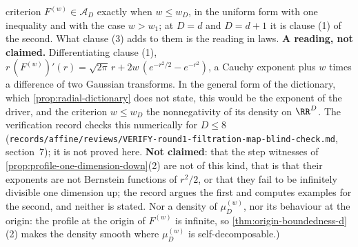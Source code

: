 \begin{proposition}
{criterion $F^{(w)} \in \mathcal{A}_D$ exactly when $w \le w_D$, in the uniform form with one
inequality and with the case $w > w_1$; at $D = d$ and $D = d + 1$ it is clause (1) of the
second. What clause (3) adds to them is the reading in laws. \textbf{A reading, not claimed.}
Differentiating clause (1), $r\,(F^{(w)})'(r) = \sqrt{2\pi}\,r + 2w\,(e^{-r^2/2} - e^{-r^2})$, a
Cauchy exponent plus $w$ times a difference of two Gaussian transforms. In the general form of
the dictionary, which \ref{prop:radial-dictionary} does not state, this would be the exponent of
the driver, and the criterion $w \le w_D$ the nonnegativity of its \Levy{} density on $\RR^D$.
The verification record checks this numerically for $D \le 8$
(\texttt{records/affine/reviews/VERIFY-round1-filtration-map-blind-check.md}, section~7); it is
not proved here. \textbf{Not claimed}: that the step witnesses of
\ref{prop:profile-one-dimension-down}(2) are not of this kind, that is that their exponents are not
Bernstein functions of $r^2/2$, or that they fail to be infinitely divisible one dimension up;
the record argues the first and computes examples for the second, and neither is stated. Nor a
density of $\mu^{(w)}_D$, nor its behaviour at the origin: the profile at the origin of
$F^{(w)}$ is infinite, so \ref{thm:origin-boundedness-d}(2) makes the density smooth where
$\mu^{(w)}_D$ is self-decomposable.)}
\end{proposition}

